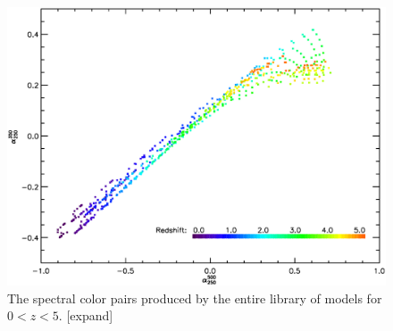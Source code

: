 \documentclass[twocolumn,letterpaper,10pt]{article}
\begin{document}
\begin{figure}
  \includegraphics[width=\textwidth]{model_colors.eps}
  \caption{The spectral color pairs produced by the entire library of models for $0<z<5$. [expand]}
  \label{slib_color}
\end{figure}
\end{document}
